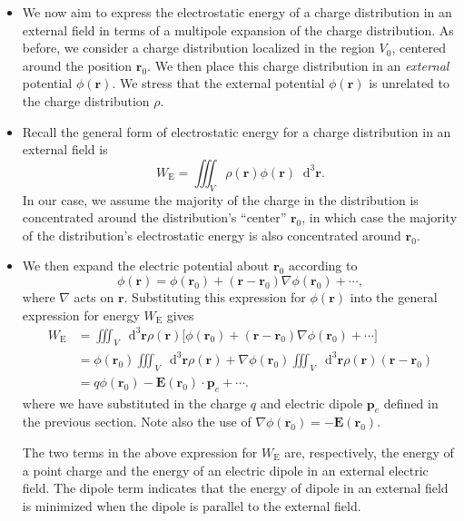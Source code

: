 \documentclass[11pt, a4paper]{article}
\newcommand{\diff}{\mathop{}\!\mathrm{d}} %
\newcommand{\dr}{\diff^{3} \r}  %
\renewcommand{\vec}[1]{\bm{#1}} %
\renewcommand{\r}{\vec{r}}
\newcommand{\E}{\vec{E}} %
\newcommand{\pe}{\vec{p}_{e}}  %
\renewcommand{\grad}{\nabla}
\begin{document}
\begin{itemize}
    \item We now aim to express the electrostatic energy of a charge distribution in an external field in terms of a multipole expansion of the charge distribution. As before, we consider a charge distribution localized in the region $ V_{0} $, centered around the position $ \r_{0} $. We then place this charge distribution in an \textit{external} potential $ \phi(\r) $. We stress that the external potential $ \phi(\r) $ is unrelated to the charge distribution $ \rho $.
	
	\item Recall the general form of electrostatic energy for a charge distribution in an external field is
	\begin{equation*}
		W_{\text{E}} = \iiint_{V} \rho(\r) \phi(\r) \dr.
	\end{equation*}
	In our case, we assume the majority of the charge in the distribution is concentrated around the distribution's ``center'' $ \r_{0} $, in which case the majority of the distribution's electrostatic energy is also concentrated around $ \r_{0} $. 
	
	\item We then expand the electric potential about $ \r_{0} $ according to
	\begin{equation*}
		\phi(\r) = \phi(\r_{0}) + (\r - \r_{0}) \grad \phi(\r_{0}) + \cdots,
	\end{equation*}
    where $ \grad $ acts on $ \r $. Substituting this expression for $ \phi(\r) $ into the general expression for energy $ W_{\text{E}} $ gives
	\begin{align*}
		W_{\text{E}} &= \iiint_{V}\dr \rho(\r)\big[\phi(\r_{0}) + (\r - \r_{0})\grad \phi(\r_{0}) + \cdots \big]\\
		& = \phi(\r_{0}) \iiint_{V} \dr \rho(\r) + \grad \phi(\r_{0}) \iiint_{V} \dr \rho(\r)(\r - \r_{0})\\
		& = q \phi(\r_{0}) - \E(\r_{0}) \cdot \pe + \cdots.
	\end{align*}
    where we have substituted in the charge $ q $ and electric dipole $ \pe $ defined in the previous section. Note also the use of $ \grad\phi(\r_{0}) = - \E(\r_{0}) $. 

    The two terms in the above expression for $ W_{\text{E}} $ are, respectively, the energy of a point charge and the energy of an electric dipole in an external electric field. The dipole term indicates that the energy of dipole in an external field is minimized when the dipole is parallel to the external field.
	
\end{itemize}
\end{document}
